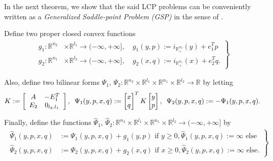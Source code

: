 \documentclass[envcountsame]{llcns2e/llncs}
\begin{document}
In the next theorem, we show that the said LCP problems can be
conveniently written as a \textit{Generalized Saddle-point Problem
  (GSP)} in the sense of \cite{he2013accelerating}.
\begin{theorem}
Define two proper closed convex functions
  \begin{eqnarray}
    \left.
    \begin{aligned}
      g_1: \mathbb{R}^{n_2} &\times \mathbb{R}^{l_1} \rightarrow
      (-\infty, +\infty], \hspace{1em} g_1(y, p) :=
        i_{\mathbb{R}^{n_2}_+}(y) + e_1^Tp\\
        g_2: \mathbb{R}^{n_1} &\times \mathbb{R}^{l_2} \rightarrow
        (-\infty, +\infty],\hspace{1em} g_2(x, q) :=
          i_{\mathbb{R}^{n_1}_+}(x) + e_2^Tq.
    \end{aligned}
    \right\}
    \label{eq:things}
  \end{eqnarray}

Also, define two bilinear forms $\Psi_1$, $\Psi_2: \mathbb{R}^{n_2}
\times \mathbb{R}^{l_1} \times \mathbb{R}^{n_1} \times
\mathbb{R}^{l_2} \rightarrow \mathbb{R}$ by letting
  \begin{equation}
      K :=
      \left[
        \begin{array}{cc}
          A & -E_1^T \\
          E_2 & 0_{l_2, l_1}
        \end{array}
        \right],\hspace{.5em}
    \Psi_1(y, p, x, q)
    := \begin{bmatrix}x\\q\end{bmatrix}^TK\begin{bmatrix}y\\p\end{bmatrix}, \hspace{.5em}
      \Psi_2(y, p, x, q) := -\Psi_1(y, p, x, q).
\end{equation}

Finally, define the functions $\hat{\Psi}_1$, $\hat{\Psi}_2:
\mathbb{R}^{n_2} \times \mathbb{R}^{l_1} \times \mathbb{R}^{n_1}
\times \mathbb{R}^{l_2} \rightarrow (-\infty, +\infty]$ by
\begin{eqnarray}
  \left.
  \begin{aligned}
    \hat{\Psi}_1(y, p, x, q) &:=
    \Psi_1(y, p, x, q)+ g_1(y, p) \text{ if }y \ge 0, \hat{\Psi}_1(y,
    p, x, q) := \infty \text{ else}\\
    \hat{\Psi}_2(y, p, x, q) &:= \Psi_2(y, p, x, q)+ g_2(x, q) \text{ if
    }x \ge 0, \hat{\Psi}_2(y,p, x, q) := \infty \text{ else}.
  \end{aligned}
  \right\}
\end{eqnarray}


\end{theorem}
\end{document}
